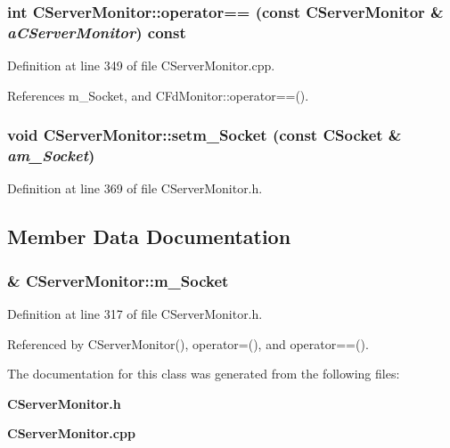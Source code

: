 \subsubsection{\setlength{\rightskip}{0pt plus 5cm}int CServer\-Monitor::operator== (const CServer\-Monitor \& {\em a\-CServer\-Monitor}) const}\label{classCServerMonitor_a5}




Definition at line 349 of file CServer\-Monitor.cpp.

References m\_\-Socket, and CFd\-Monitor::operator==().
\subsubsection{\setlength{\rightskip}{0pt plus 5cm}void CServer\-Monitor::setm\_\-Socket (const {\bf CSocket} \& {\em am\_\-Socket})\hspace{0.3cm}{\tt  [inline, protected]}}\label{classCServerMonitor_b0}




Definition at line 369 of file CServer\-Monitor.h.

\subsection{Member Data Documentation}
\subsubsection{\& CServer\-Monitor::m\_\-Socket\hspace{0.3cm}{\tt  [private]}}\label{classCServerMonitor_o0}




Definition at line 317 of file CServer\-Monitor.h.

Referenced by CServer\-Monitor(), operator=(), and operator==().

The documentation for this class was generated from the following files:\begin{CompactItemize}
\item 
{\bf CServer\-Monitor.h}\item 
{\bf CServer\-Monitor.cpp}\end{CompactItemize}
